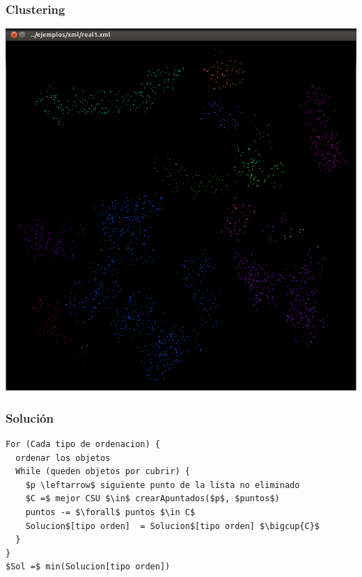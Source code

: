 \begin{frame}
    \frametitle{Clustering}
    \endblock{}
		\begin{center}
    \includegraphics[height=0.8\textheight]{FIGURES/dbscan-e86-m4}
		\end{center}
\end{frame}

\begin{frame}[fragile]
    \frametitle{Solución}
    \endblock{}
		\begin{center}
    \begin{lstlisting}[linewidth=\linewidth, mathescape,
    numbers=none,basicstyle=\ttfamily\footnotesize]
For (Cada tipo de ordenacion) {
  ordenar los objetos
  While (queden objetos por cubrir) {
    $p \leftarrow$ siguiente punto de la lista no eliminado
    $C =$ mejor CSU $\in$ crearApuntados($p$, $puntos$)
    puntos -= $\forall$ puntos $\in C$
    Solucion$[tipo orden]  = Solucion$[tipo orden] $\bigcup{C}$
  }
}
$Sol =$ min(Solucion[tipo orden])
    \end{lstlisting}
		\end{center}
\end{frame}

